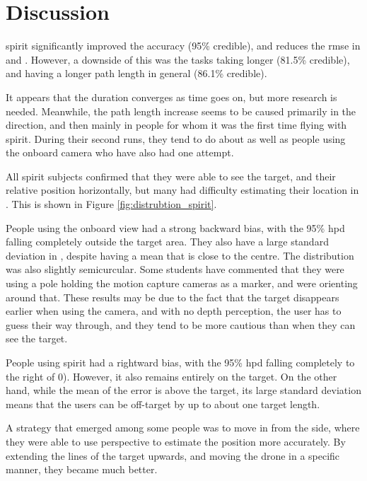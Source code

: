 \chapter{Discussion}
\gls{spirit} significantly improved the accuracy (95\% credible), and reduces the \gls{rmse} in  and .
However, a downside of this was the tasks taking longer (81.5\% credible), and having a longer path length in general (86.1\% credible).

It appears that the duration converges as time goes on, but more research is needed.
Meanwhile, the path length increase seems to be caused primarily in the  direction, and then mainly in people for whom it was the first time flying with \gls{spirit}.
During their second runs, they tend to do about as well as people using the onboard camera who have also had one attempt.

All \gls{spirit} subjects confirmed that they were able to see the target, and their relative position horizontally, but many had difficulty estimating their location in .
This is shown in Figure \ref{fig:distrubtion_spirit}.

People using the onboard view had a strong backward bias, with the 95\% \gls{hpd} falling completely outside the target area.
They also have a large standard deviation in , despite having a mean that is close to the centre.
The distribution was also slightly semicurcular.
Some students have commented that they were using a pole holding the motion capture cameras as a marker, and were orienting around that.
These results may be due to the fact that the target disappears earlier when using the camera, and with no depth perception, the user has to guess their way through, and they tend to be more cautious than when they can see the target.

People using \gls{spirit} had a rightward bias, with the 95\% \gls{hpd} falling completely to the right of 0).
However, it also remains entirely on the target.
On the other hand, while the mean of the  error is above the target, its large standard deviation means that the users can be off-target by up to about one target length.

A strategy that emerged among some people was to move in from the side, where they were able to use perspective to estimate the position more accurately.
By extending the lines of the target upwards, and moving the drone in a specific manner, they became much better.


